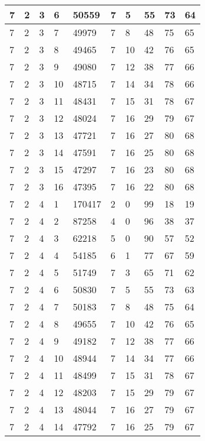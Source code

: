 \begin{table}[!ht]
\begin{tabular}{|l|l|l|l|l|l|l|l|l|l|}
        7 & 2 & 3 & 6 & 50559 & 7 & 5 & 55 & 73 & 64 \\ \hline
        7 & 2 & 3 & 7 & 49979 & 7 & 8 & 48 & 75 & 65 \\ \hline
        7 & 2 & 3 & 8 & 49465 & 7 & 10 & 42 & 76 & 65 \\ \hline
        7 & 2 & 3 & 9 & 49080 & 7 & 12 & 38 & 77 & 66 \\ \hline
        7 & 2 & 3 & 10 & 48715 & 7 & 14 & 34 & 78 & 66 \\ \hline
        7 & 2 & 3 & 11 & 48431 & 7 & 15 & 31 & 78 & 67 \\ \hline
        7 & 2 & 3 & 12 & 48024 & 7 & 16 & 29 & 79 & 67 \\ \hline
        7 & 2 & 3 & 13 & 47721 & 7 & 16 & 27 & 80 & 68 \\ \hline
        7 & 2 & 3 & 14 & 47591 & 7 & 16 & 25 & 80 & 68 \\ \hline
        7 & 2 & 3 & 15 & 47297 & 7 & 16 & 23 & 80 & 68 \\ \hline
        7 & 2 & 3 & 16 & 47395 & 7 & 16 & 22 & 80 & 68 \\ \hline
        7 & 2 & 4 & 1 & 170417 & 2 & 0 & 99 & 18 & 19 \\ \hline
        7 & 2 & 4 & 2 & 87258 & 4 & 0 & 96 & 38 & 37 \\ \hline
        7 & 2 & 4 & 3 & 62218 & 5 & 0 & 90 & 57 & 52 \\ \hline
        7 & 2 & 4 & 4 & 54185 & 6 & 1 & 77 & 67 & 59 \\ \hline
        7 & 2 & 4 & 5 & 51749 & 7 & 3 & 65 & 71 & 62 \\ \hline
        7 & 2 & 4 & 6 & 50830 & 7 & 5 & 55 & 73 & 63 \\ \hline
        7 & 2 & 4 & 7 & 50183 & 7 & 8 & 48 & 75 & 64 \\ \hline
        7 & 2 & 4 & 8 & 49655 & 7 & 10 & 42 & 76 & 65 \\ \hline
        7 & 2 & 4 & 9 & 49182 & 7 & 12 & 38 & 77 & 66 \\ \hline
        7 & 2 & 4 & 10 & 48944 & 7 & 14 & 34 & 77 & 66 \\ \hline
        7 & 2 & 4 & 11 & 48499 & 7 & 15 & 31 & 78 & 67 \\ \hline
        7 & 2 & 4 & 12 & 48203 & 7 & 15 & 29 & 79 & 67 \\ \hline
        7 & 2 & 4 & 13 & 48044 & 7 & 16 & 27 & 79 & 67 \\ \hline
        7 & 2 & 4 & 14 & 47792 & 7 & 16 & 25 & 79 & 67 \\ \hline

\end{tabular}
\end{table}

